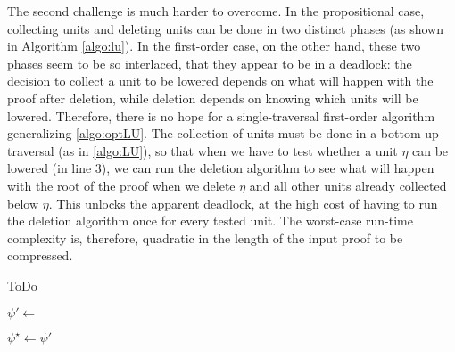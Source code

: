 The second challenge is much harder to overcome. In the propositional case, collecting units and deleting units can be done in two distinct phases (as shown in Algorithm \ref{algo:lu}). In the first-order case, on the other hand, these two phases seem to be so interlaced, that they appear to be in a deadlock: the decision to collect a unit to be lowered depends on what will happen with the proof after deletion, while deletion depends on knowing which units will be lowered. Therefore, there is no hope for a single-traversal first-order {\LowerUnits} algorithm generalizing \ref{algo:optLU}. The collection of units must be done in a bottom-up traversal (as in \ref{algo:LU}), so that when we have to test whether a unit $\eta$ can be lowered (in line 3), we can run the deletion algorithm to see what will happen with the root of the proof when we delete $\eta$ and all other units already collected below $\eta$. This unlocks the apparent deadlock, at the high cost of having to run the deletion algorithm once for every tested unit. The worst-case run-time complexity is, therefore, quadratic in the length of the input proof to be compressed.

\begin{algorithm}[bt]
  \SetAlgoVlined
  \SetAlgoShortEnd
  \BlankLine

  ToDo \;

  \BlankLine

  \BlankLine

  $\psi' \leftarrow $ \Del{$\psi$,$\Units$} \;
  \BlankLine

  $\psi^{\star} \leftarrow \psi'$ \;

  \caption{\FOLowerUnits}
  \label{algo:FOLU}
\end{algorithm}



\clearpage
